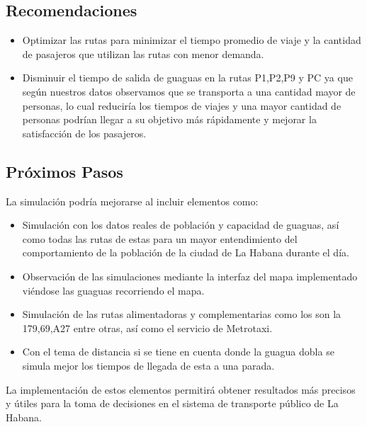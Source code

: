 \documentclass[a4paper,12pt]{article}
\begin{document}
\subsection{Recomendaciones}

\begin{itemize}
\item Optimizar las rutas para minimizar el tiempo promedio de viaje y la cantidad de pasajeros que utilizan las rutas con menor demanda.
\item Disminuir el tiempo de salida de guaguas en la rutas P1,P2,P9 y PC ya que según nuestros datos observamos que  se transporta a una cantidad mayor de personas, lo cual reduciría los tiempos de viajes y una mayor cantidad de personas podrían llegar a su objetivo más rápidamente y mejorar la satisfacción de los pasajeros.
\end{itemize}

\subsection{Próximos Pasos}

La simulación podría mejorarse al incluir elementos como:

\begin{itemize}
\item Simulación con los datos reales de población y capacidad de guaguas, así como todas las rutas de estas para un mayor entendimiento del comportamiento de la población de la ciudad de La Habana durante el día.
\item Observaci\'on de las simulaciones mediante la interfaz del mapa implementado vi\'endose las guaguas recorriendo el mapa.
\item Simulaci\'on de las rutas alimentadoras y complementarias como los son la 179,69,A27 entre otras, as\'i como el servicio de Metrotaxi.
\item Con el tema de distancia si se tiene en cuenta donde la guagua dobla se simula mejor los tiempos de llegada de esta a una parada.
\end{itemize}

La implementación de estos elementos permitirá obtener resultados más precisos y útiles para la toma de decisiones en el sistema de transporte público de La Habana.


\end{document}
